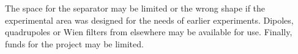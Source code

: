  The space   for the separator may be limited or the wrong shape if the experimental area was designed for the needs of earlier experiments.   Dipoles, quadrupoles  or Wien filters from elsewhere  may be available for use.  Finally,  funds for the project may be limited.   


 

